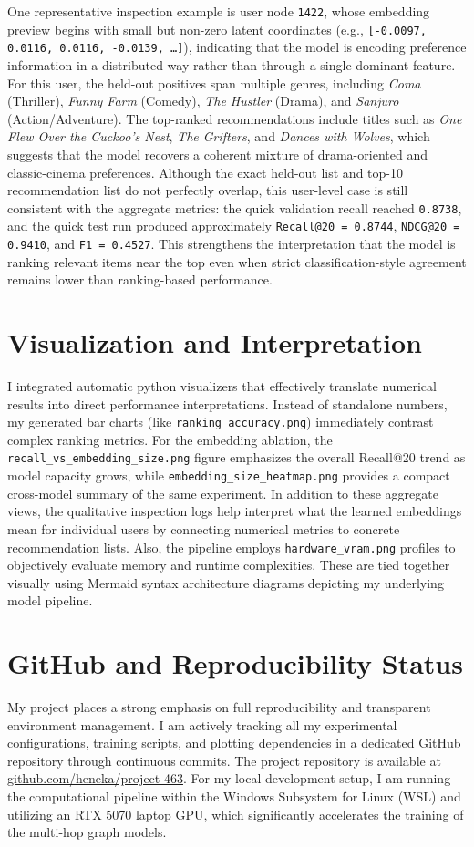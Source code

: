 \documentclass[12pt, a4paper]{article}
\begin{document}
One representative inspection example is user node \texttt{1422}, whose embedding preview begins with small but non-zero latent coordinates (e.g., \texttt{[-0.0097, 0.0116, 0.0116, -0.0139, \dots]}), indicating that the model is encoding preference information in a distributed way rather than through a single dominant feature. For this user, the held-out positives span multiple genres, including \emph{Coma} (Thriller), \emph{Funny Farm} (Comedy), \emph{The Hustler} (Drama), and \emph{Sanjuro} (Action/Adventure). The top-ranked recommendations include titles such as \emph{One Flew Over the Cuckoo's Nest}, \emph{The Grifters}, and \emph{Dances with Wolves}, which suggests that the model recovers a coherent mixture of drama-oriented and classic-cinema preferences. Although the exact held-out list and top-10 recommendation list do not perfectly overlap, this user-level case is still consistent with the aggregate metrics: the quick validation recall reached \texttt{0.8738}, and the quick test run produced approximately \texttt{Recall@20 = 0.8744}, \texttt{NDCG@20 = 0.9410}, and \texttt{F1 = 0.4527}. This strengthens the interpretation that the model is ranking relevant items near the top even when strict classification-style agreement remains lower than ranking-based performance.

\section{Visualization and Interpretation}
I integrated automatic python visualizers that effectively translate numerical results into direct performance interpretations. Instead of standalone numbers, my generated bar charts (like \texttt{ranking\_accuracy.png}) immediately contrast complex ranking metrics. For the embedding ablation, the \texttt{recall\_vs\_embedding\_size.png} figure emphasizes the overall Recall@20 trend as model capacity grows, while \texttt{embedding\_size\_heatmap.png} provides a compact cross-model summary of the same experiment. In addition to these aggregate views, the qualitative inspection logs help interpret what the learned embeddings mean for individual users by connecting numerical metrics to concrete recommendation lists. Also, the pipeline employs \texttt{hardware\_vram.png} profiles to objectively evaluate memory and runtime complexities. These are tied together visually using Mermaid syntax architecture diagrams depicting my underlying model pipeline.

\section{GitHub and Reproducibility Status}
My project places a strong emphasis on full reproducibility and transparent environment management. I am actively tracking all my experimental configurations, training scripts, and plotting dependencies in a dedicated GitHub repository through continuous commits. The project repository is available at \href{https://github.com/heneka/project-463}{github.com/heneka/project-463}. For my local development setup, I am running the computational pipeline within the Windows Subsystem for Linux (WSL) and utilizing an RTX 5070 laptop GPU, which significantly accelerates the training of the multi-hop graph models. 
\end{document}
